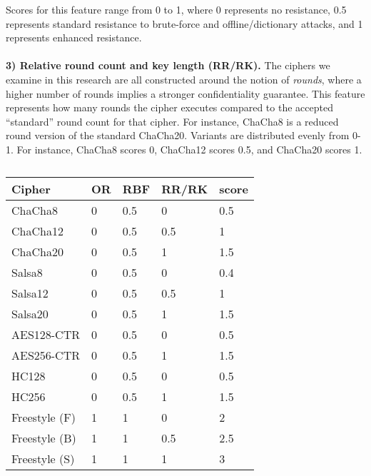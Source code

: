 Scores for this feature range from 0 to 1, where 0 represents no resistance,
0.5 represents standard resistance to brute-force and offline/dictionary
attacks, and 1 represents enhanced resistance.\\
\\
\textbf{3) Relative round count and key length (RR/RK).} The ciphers we examine
in this research are all constructed around the notion of \emph{rounds}, where a
higher number of rounds implies a stronger confidentiality guarantee. This
feature represents how many rounds the cipher executes compared to the accepted
``standard'' round count for that cipher. For instance, ChaCha8 is a reduced round
version of the standard ChaCha20. Variants are distributed evenly from 0-1. For
instance, ChaCha8 scores 0, ChaCha12 scores 0.5, and ChaCha20 scores 1\@.

\begin{table}[]
  \begin{tabular}{@{}lllll@{}}
  \toprule
  \textbf{Cipher} & \textbf{OR} & \textbf{RBF} & \textbf{RR/RK} & \textbf{score} \\ \midrule
  ChaCha8     & 0      & 0.5     & 0       & 0.5      \\
  ChaCha12    & 0      & 0.5     & 0.5      & 1       \\
  ChaCha20    & 0      & 0.5     & 1       & 1.5      \\
  Salsa8     & 0      & 0.5     & 0       & 0.4      \\
  Salsa12     & 0      & 0.5     & 0.5      & 1      \\
  Salsa20     & 0      & 0.5     & 1       & 1.5      \\
  AES128-CTR   & 0      & 0.5     & 0       & 0.5      \\
  AES256-CTR   & 0      & 0.5     & 1       & 1.5      \\
  HC128      & 0      & 0.5     & 0       & 0.5      \\
  HC256      & 0      & 0.5     & 1       & 1.5      \\
  Freestyle (F)  & 1      & 1      & 0       & 2       \\
  Freestyle (B)  & 1      & 1      & 0.5      & 2.5      \\
  Freestyle (S)  & 1      & 1      & 1       & 3
  \end{tabular}
  \caption{}
  \label{tbl:security-quant}
\end{table}
